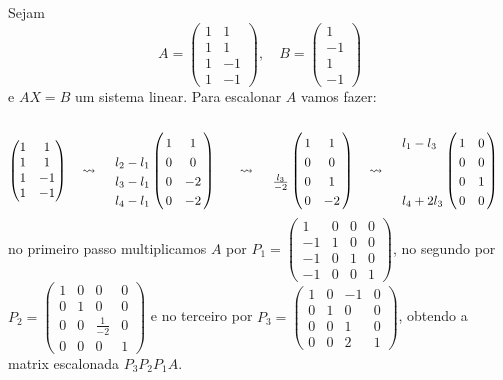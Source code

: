\begin{ex}
	Sejam $$A=\begin{pmatrix}
	1&1\\1&1\\1&-1\\1&-1
	\end{pmatrix},\quad B=\begin{pmatrix}
	1\\-1\\1\\-1
	\end{pmatrix}$$ e $AX=B$ um sistema linear. Para escalonar $A$ vamos fazer:
	\begin{alignat*}{4}
	\begin{pmatrix}
	1&1\\1&1\\1&-1\\1&-1
	\end{pmatrix}\quad&\rightsquigarrow\quad\bordermatrix{&&\cr&1&1\cr l_2-l_1&0&0\cr l_3-l_1&0&-2\cr l_4-l_1&0&-2}\quad&\rightsquigarrow\quad\bordermatrix{&&\cr&1&1\cr&0&0\cr\frac{l_3}{-2}&0&1\cr&0&-2}\quad&\rightsquigarrow\quad\bordermatrix{
	&&\cr l_1-l_3&1&0\cr &0&0\cr &0&1\cr l_4+2l_3 & 0 & 0
	}
	\end{alignat*}no primeiro passo multiplicamos $A$ por $P_1=\begin{pmatrix}
	1&0&0&0\\-1&1&0&0\\-1&0&1&0\\-1&0&0&1
	\end{pmatrix}$, no segundo por $P_2=\begin{pmatrix}
	1&0&0&0\\0&1&0&0\\0&0&\frac{1}{-2}&0\\0&0&0&1
	\end{pmatrix}$ e no terceiro por $P_3=\begin{pmatrix}
	1&0&-1&0\\0&1&0&0\\0&0&1&0\\0&0&2&1
	\end{pmatrix}$, obtendo a matrix escalonada $P_3P_2P_1A$.
	

\end{ex}
